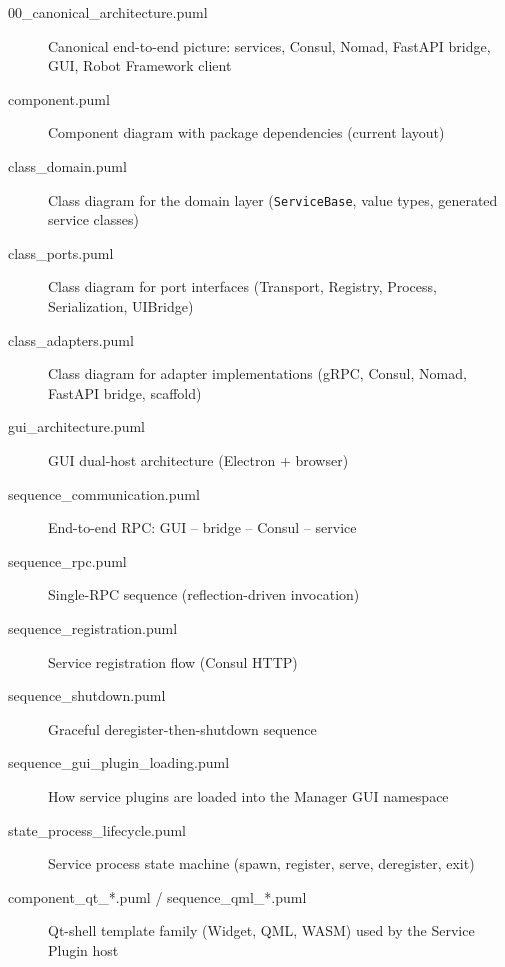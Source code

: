 \begin{description}
   \item[00\_canonical\_architecture.puml] Canonical end-to-end picture: services,
        Consul, Nomad, FastAPI bridge, GUI, Robot Framework client
   \item[component.puml] Component diagram with package dependencies (current layout)
   \item[class\_domain.puml] Class diagram for the domain layer
        (\texttt{ServiceBase}, value types, generated service classes)
   \item[class\_ports.puml] Class diagram for port interfaces (Transport, Registry,
        Process, Serialization, UIBridge)
   \item[class\_adapters.puml] Class diagram for adapter implementations (gRPC,
        Consul, Nomad, FastAPI bridge, scaffold)
   \item[gui\_architecture.puml] GUI dual-host architecture (Electron + browser)
   \item[sequence\_communication.puml] End-to-end RPC: GUI -- bridge -- Consul -- service
   \item[sequence\_rpc.puml] Single-RPC sequence (reflection-driven invocation)
   \item[sequence\_registration.puml] Service registration flow (Consul HTTP)
   \item[sequence\_shutdown.puml] Graceful deregister-then-shutdown sequence
   \item[sequence\_gui\_plugin\_loading.puml] How service plugins are loaded into the
        Manager GUI namespace
   \item[state\_process\_lifecycle.puml] Service process state machine (spawn,
        register, serve, deregister, exit)
   \item[component\_qt\_*.puml / sequence\_qml\_*.puml] Qt-shell template family
        (Widget, QML, WASM) used by the Service Plugin host
\end{description}
